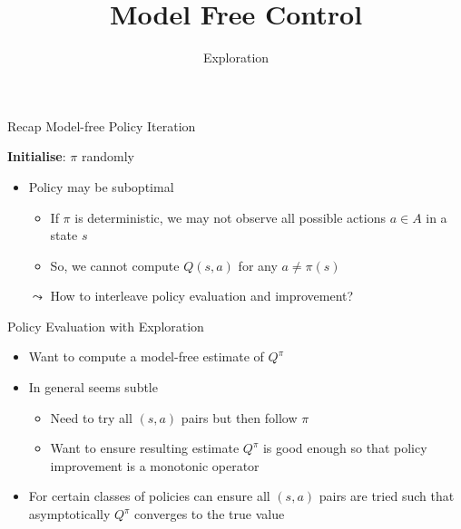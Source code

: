 \documentclass[aspectratio=169]{../latex_main/tntbeamer}  %
\title[RL: Model Free Control]{Model Free Control}
\subtitle{Exploration}
\begin{document}
	
	\maketitle

\begin{frame}[c]{Recap Model-free Policy Iteration}
	
    \begin{algorithm}[H]
        \caption{General Model Free Control Algorithm}
        \DontPrintSemicolon
        \LinesNotNumbered
        \textbf{Initialise}: $\pi$ randomly
        
    \end{algorithm}
    \bigskip
    \pause
    \begin{itemize}
		\item Policy may be suboptimal
		\begin{itemize}
			\item If $\pi$ is deterministic, we may not observe all possible actions $a\in A$ in a state $s$
			\item So, we cannot compute $Q(s,a)$ for any $a \neq \pi(s)$
		\end{itemize}
		\pause
		\item[$\leadsto$] How to interleave policy evaluation and improvement?
	\end{itemize}

\end{frame}
\begin{frame}[c]{Policy Evaluation with Exploration}
	
	\begin{itemize}
		\item Want to compute a model-free estimate of $Q^\pi$
		\item In general seems subtle
		\begin{itemize}
			\item Need to try all $(s,a)$ pairs but then follow $\pi$
			\item Want to ensure resulting estimate $Q^\pi$ is good enough so that policy
			improvement is a monotonic operator
		\end{itemize}
		\item For certain classes of policies can ensure all $(s,a)$ pairs are tried such
		that asymptotically $Q^\pi$ converges to the true value
	\end{itemize}
	
\end{frame}
\end{document}
